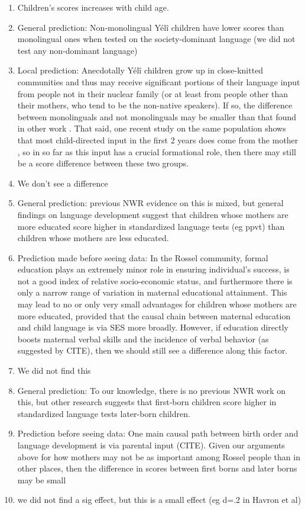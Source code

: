 \documentclass[english,,man,floatsintext]{apa6}
\begin{document}
\begin{enumerate}
\def\labelenumi{\arabic{enumi}.}
\setcounter{enumi}{2}
\item
  Children's scores increases with child age.
\item
  General prediction: Non-monolingual Yélî children have lower scores
  than monolingual ones when tested on the society-dominant language (we
  did not test any non-dominant language) 
\item
  Local prediction: Anecdotally Yélî children grow up in close-knitted
  communities and thus may receive significant portions of their
  language input from people not in their nuclear family (or at least
  from people other than their mothers, who tend to be the non-native
  speakers). If so, the difference between monolinguals and not
  monolinguals may be smaller than that found in other work . That said,
  one recent study on the same population shows that most child-directed
  input in the first 2 years does come from the mother , so in so far as
  this input has a crucial formational role, then there may still be a
  score difference between these two groups.
\item
  We don't see a difference
\item
  General prediction: previous NWR evidence on this is mixed, but
  general findings on language development suggest that children whose
  mothers are more educated score higher in standardized language tests
  (eg ppvt) than children whose mothers are less educated.
\item
  Prediction made before seeing data: In the Rossel community, formal
  education plays an extremely minor role in ensuring individual's
  success, is not a good index of relative socio-economic status, and
  furthermore there is only a narrow range of variation in maternal
  educational attainment. This may lead to no or only very small
  advantages for children whose mothers are more educated, provided that
  the causal chain between maternal education and child language is via
  SES more broadly. However, if education directly boosts maternal
  verbal skills and the incidence of verbal behavior (as suggested by
  CITE), then we should still see a difference along this factor.
\item
  We did not find this
\item
  General prediction: To our knowledge, there is no previous NWR work on
  this, but other research suggests that first-born children score
  higher in standardized language tests later-born children.
\item
  Prediction before seeing data: One main causal path between birth
  order and language development is via parental input (CITE). Given our
  arguments above for how mothers may not be as important among Rossel
  people than in other places, then the difference in scores between
  first borns and later borns may be small
\item
  we did not find a sig effect, but this is a small effect (eg d=.2 in
  Havron et al)
\end{enumerate}
\end{document}
